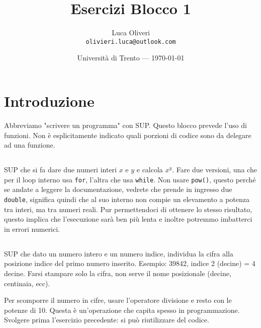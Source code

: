 \documentclass{article}
\title{Esercizi Blocco 1} %
\author{Luca Oliveri\\ \texttt{olivieri.luca@outlook.com}} %
\date{Università di Trento --- \today} %
\begin{document}
\maketitle %


\section*{Introduzione} %
Abbreviamo "scrivere un programma" con SUP. Questo blocco prevede l'uso di funzioni. Non è esplicitamente indicato quali porzioni di codice sono da delegare ad una funzione.


\setcounter{section}{1}


\subsection{} 
SUP che si fa dare due numeri interi $x$ e $y$ e calcola $x^y$. Fare due versioni, una che per il loop interno usa \texttt{for}, l'altra che usa \texttt{while}. Non usare \texttt{pow()}, questo perché se andate a leggere la documentazione, vedrete che prende in ingresso due \texttt{double}, significa quindi che al suo interno non compie un elevamento a potenza tra interi, ma tra numeri reali. Pur permettendoci di ottenere lo stesso risultato, questo implica che l'esecuzione sarà ben più lenta e inoltre potremmo imbatterci in errori numerici.


\subsection{}
SUP che dato un numero intero e un numero indice, individua la cifra alla posizione indice del primo numero inserito. Esempio: 39842, indice 2 (decine) = 4 decine. Farsi stampare solo la cifra, non serve il nome posizionale (decine, centinaia, ecc).
\begin{info} 
	Per scomporre il numero in cifre, usare l'operatore divisione e resto con le potenze di 10. Questa è un'operazione che capita spesso in programmazione. Svolgere prima l'esercizio precedente: si può riutilizzare del codice.
\end{info}
\end{document}
